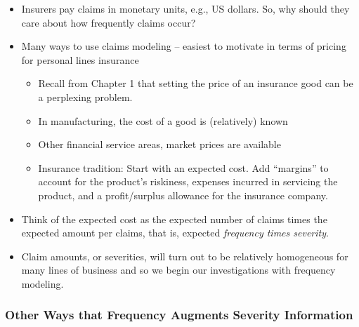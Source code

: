\documentclass[]{book}
\begin{document}
\begin{itemize}
\item
  Insurers pay claims in monetary units, e.g., US dollars. So, why
  should they care about how frequently claims occur?
\item
  Many ways to use claims modeling -- easiest to motivate in terms of
  pricing for personal lines insurance

  \begin{itemize}
  \item
    Recall from Chapter 1 that setting the price of an insurance good
    can be a perplexing problem.
  \item
    In manufacturing, the cost of a good is (relatively) known
  \item
    Other financial service areas, market prices are available
  \item
    Insurance tradition: Start with an expected cost. Add ``margins'' to
    account for the product's riskiness, expenses incurred in servicing
    the product, and a profit/surplus allowance for the insurance
    company.
  \end{itemize}
\item
  Think of the expected cost as the expected number of claims times the
  expected amount per claims, that is, expected \emph{frequency times
  severity}.
\item
  Claim amounts, or severities, will turn out to be relatively
  homogeneous for many lines of business and so we begin our
  investigations with frequency modeling.
\end{itemize}

\subsubsection{Other Ways that Frequency Augments Severity
Information}\label{other-ways-that-frequency-augments-severity-information}
\end{document}
